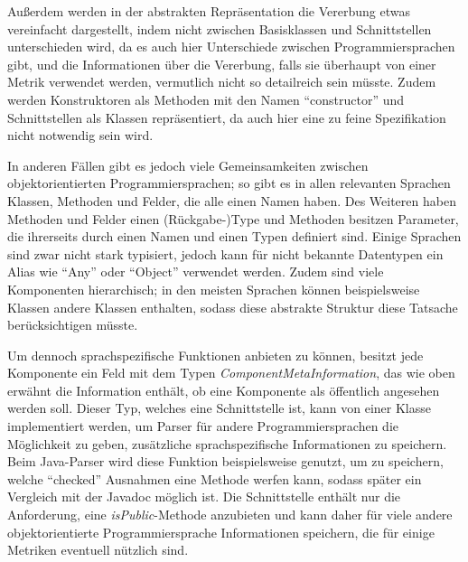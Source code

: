 Außerdem werden in der abstrakten Repräsentation die Vererbung etwas vereinfacht dargestellt, indem nicht zwischen Basisklassen und Schnittstellen unterschieden wird, da es auch hier Unterschiede zwischen Programmiersprachen gibt, und die Informationen über die Vererbung, falls sie überhaupt von einer Metrik verwendet werden, vermutlich nicht so detailreich sein müsste. Zudem werden Konstruktoren als Methoden mit den Namen \enquote{constructor} und Schnittstellen als Klassen repräsentiert, da auch hier eine zu feine Spezifikation nicht notwendig sein wird.  

  

In anderen Fällen gibt es jedoch viele Gemeinsamkeiten zwischen objektorientierten Programmiersprachen; so gibt es in  allen relevanten Sprachen Klassen, Methoden und Felder, die alle einen Namen haben. Des Weiteren haben Methoden und Felder einen (Rückgabe-)Type und Methoden besitzen Parameter, die ihrerseits durch einen Namen und einen Typen definiert sind. Einige Sprachen sind zwar nicht stark typisiert, jedoch kann für nicht bekannte Datentypen ein Alias wie \enquote{Any} oder  \enquote{Object} verwendet werden.  Zudem sind viele Komponenten hierarchisch; in den meisten Sprachen können beispielsweise Klassen andere Klassen enthalten, sodass diese abstrakte Struktur diese Tatsache berücksichtigen müsste. 

Um dennoch sprachspezifische Funktionen anbieten zu können, besitzt jede Komponente ein Feld mit dem Typen \textit{ComponentMetaInformation}, das wie oben erwähnt die Information enthält, ob eine Komponente als öffentlich angesehen werden soll. Dieser Typ, welches eine Schnittstelle ist, kann von einer Klasse implementiert werden, um Parser für andere Programmiersprachen die Möglichkeit zu geben, zusätzliche sprachspezifische Informationen zu speichern. Beim Java-Parser wird diese Funktion beispielsweise genutzt, um zu speichern, welche \enquote{checked} Ausnahmen eine Methode werfen kann, sodass später ein Vergleich mit der Javadoc möglich ist. Die Schnittstelle enthält nur die Anforderung, eine \textit{isPublic}-Methode anzubieten und kann daher für viele andere objektorientierte Programmiersprache Informationen speichern, die für einige Metriken eventuell nützlich sind. 


